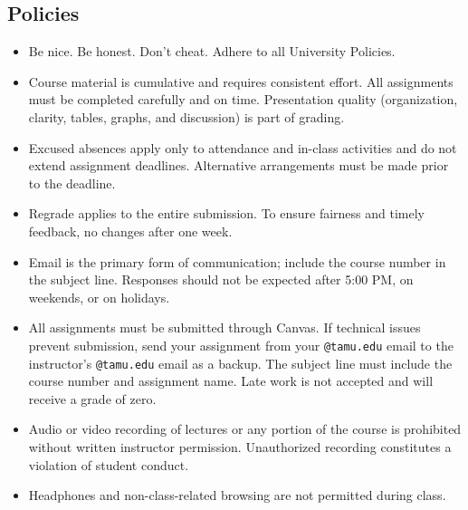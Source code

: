 \documentclass[11pt]{article}
\begin{document}
\subsection*{Policies}
\begin{itemize}[leftmargin=*,nosep]
\item Be nice. Be honest. Don’t cheat. Adhere to all University Policies.
\item Course material is cumulative and requires consistent effort. All assignments must be completed carefully and on time.
      Presentation quality (organization, clarity, tables, graphs, and discussion) is part of grading.
\item Excused absences apply only to attendance and in-class activities and do not extend assignment deadlines.
      Alternative arrangements must be made prior to the deadline.
\item Regrade applies to the entire submission. To ensure fairness and timely feedback, no changes after one week.
\item Email is the primary form of communication; include the course number in the subject line.
      Responses should not be expected after 5:00 PM, on weekends, or on holidays.
\item All assignments must be submitted through Canvas.
      If technical issues prevent submission, send your assignment from your \texttt{@tamu.edu} email to the instructor’s \texttt{@tamu.edu} email as a backup.
      The subject line must include the course number and assignment name.
      Late work is not accepted and will receive a grade of zero.
\item Audio or video recording of lectures or any portion of the course is prohibited without written instructor permission. Unauthorized recording constitutes a violation of student conduct.
\item Headphones and non-class-related browsing are not permitted during class.
\end{itemize}

\end{document}
